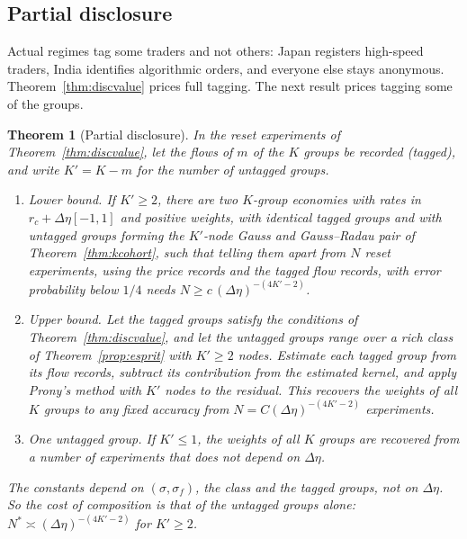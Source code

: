 \documentclass[12pt]{article}
\newtheorem{theorem}{Theorem}[section]
\theoremstyle{definition}
\theoremstyle{remark}
\begin{document}
\subsection{Partial disclosure}\label{sec:partial}

Actual regimes tag some traders and not others: Japan registers high-speed traders, India identifies algorithmic orders, and everyone else stays anonymous. Theorem~\ref{thm:discvalue} prices full tagging. The next result prices tagging some of the groups.

\begin{theorem}[Partial disclosure]\label{thm:partial}
In the reset experiments of Theorem~\ref{thm:discvalue}, let the flows of $m$ of the $K$ groups be recorded (tagged), and write $K'=K-m$ for the number of untagged groups.
\begin{enumerate}[label=(\roman*),itemsep=1pt]
\item \emph{Lower bound.} If $K'\ge2$, there are two $K$-group economies with rates in $r_c+\Delta\eta[-1,1]$ and positive weights, with identical tagged groups and with untagged groups forming the $K'$-node Gauss and Gauss--Radau pair of Theorem~\ref{thm:kcohort}, such that telling them apart from $N$ reset experiments, using the price records and the tagged flow records, with error probability below $1/4$ needs $N\ge c\,(\Delta\eta)^{-(4K'-2)}$.
\item \emph{Upper bound.} Let the tagged groups satisfy the conditions of Theorem~\ref{thm:discvalue}, and let the untagged groups range over a rich class of Theorem~\ref{prop:esprit} with $K'\ge2$ nodes. Estimate each tagged group from its flow records, subtract its contribution from the estimated kernel, and apply Prony's method with $K'$ nodes to the residual. This recovers the weights of all $K$ groups to any fixed accuracy from $N=C(\Delta\eta)^{-(4K'-2)}$ experiments.
\item \emph{One untagged group.} If $K'\le1$, the weights of all $K$ groups are recovered from a number of experiments that does not depend on $\Delta\eta$.
\end{enumerate}
The constants depend on $(\sigma,\sigma_f)$, the class and the tagged groups, not on $\Delta\eta$. So the cost of composition is that of the untagged groups alone: $N^*\asymp(\Delta\eta)^{-(4K'-2)}$ for $K'\ge2$.
\end{theorem}
\end{document}
